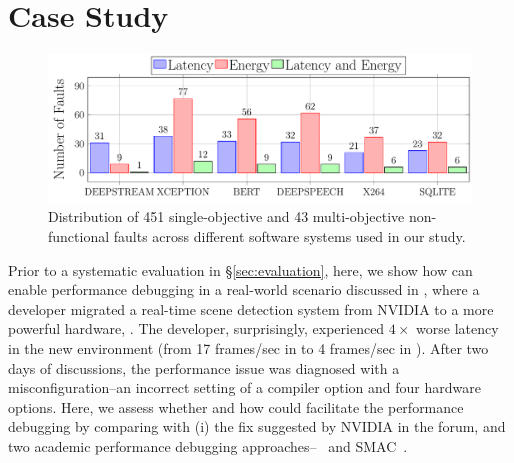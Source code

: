 \section{Case Study}
\label{sec:casestudy}

\begin{figure}[tp!]
    \centering
    \includegraphics*[width=\linewidth]{figures-vg/barplot_fault.pdf}
    \caption{\small {Distribution of 451 single-objective and 43 multi-objective non-functional faults across different software systems used in our study.}}
    
    \label{fig:jetson_faults}
\end{figure}
Prior to a systematic evaluation in \S\ref{sec:evaluation}, here, we show how \ourapproach can enable performance debugging in a real-world scenario discussed in \cite{code_transplant:online}, where a developer migrated a real-time scene detection system from NVIDIA \txone to a more powerful hardware, \txtwo. The developer, surprisingly, experienced $4\times$ worse latency in the new environment (from 17 frames/sec in \txone to 4 frames/sec in \txtwo). %
After two days of discussions, the performance issue was diagnosed with a misconfiguration--an incorrect setting of a compiler option and four hardware options.
Here, we assess whether and how \ourapproach could facilitate the performance debugging by comparing with (i) the fix suggested by NVIDIA in the forum, and two academic performance debugging approaches--\bugdoc~\cite{lourencco2020bugdoc} and SMAC~\cite{hutter2011sequential}.
% 


